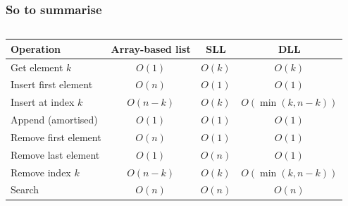 \begin{frame}
	\frametitle{So to summarise}
\begin{columns}
	\begin{tabular}{l | c | c | c}
	Operation & Array-based list & SLL & DLL \\	
	\midrule
	Get element $k$ & $O(1)$ &$O(k)$ & $O(k)$ \\
	\pause
	Insert first element& $O(n)$ & $O(1)$ & $O(1)$\\
	Insert at index $k$& $O(n-k)$ & $O(k)$ & $O(\min(k,n-k))$\\
	Append (amortised)& $O(1)$ & $O(1)$ & $O(1)$\\
	\pause
	Remove first element& $O(n)$ & $O(1)$ & $O(1)$\\
	Remove last element& $O(1)$ & $O(n)$ & $O(1)$\\
	Remove index $k$& $O(n-k)$ & $O(k)$ & $O(\min(k,n-k))$\\
	\pause
	Search & $O(n)$ & $O(n)$ & $O(n)$\\
	\end{tabular}
		
		
\end{columns}

\end{frame}


